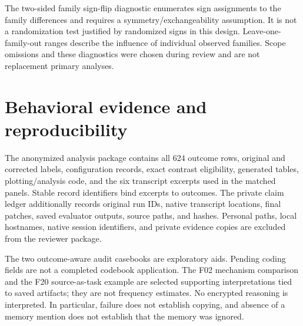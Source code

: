 The two-sided family sign-flip diagnostic enumerates sign assignments to the family differences and requires a symmetry/exchangeability assumption. It is not a randomization test justified by randomized signs in this design. Leave-one-family-out ranges describe the influence of individual observed families. Scope omissions and these diagnostics were chosen during review and are not replacement primary analyses.

\begin{table}[p]
\centering\small
\caption{Exact eligible family sets for the primary and secondary contrasts. Repetitions are averaged within these families.}
\end{table}
\begin{table}[p]
\centering\small
\caption{Uniform family-omission sensitivity analyses for $\Delta U$, in percentage points. The same family omission applies across configurations.}
\end{table}
\begin{table}[p]
\centering\small
\caption{Leave-one-family-out ranges and exact sign-flip diagnostics for corrected $\Delta U$. These are exploratory diagnostics with the assumptions described in the text.}
\end{table}
\begin{table}[p]
\centering\small
\caption{Exploratory C$-$I contrasts with the same complete-family rule and bootstrap procedure. Byte-matched memory envelopes do not ensure equal tokens or semantic content.}
\end{table}

\section{Behavioral evidence and reproducibility}
The anonymized analysis package contains all 624 outcome rows, original and corrected labels, configuration records, exact contrast eligibility, generated tables, plotting/analysis code, and the six transcript excerpts used in the matched panels. Stable record identifiers bind excerpts to outcomes. The private claim ledger additionally records original run IDs, native transcript locations, final patches, saved evaluator outputs, source paths, and hashes. Personal paths, local hostnames, native session identifiers, and private evidence copies are excluded from the reviewer package.

The two outcome-aware audit casebooks are exploratory aids. Pending coding fields are not a completed codebook application. The F02 mechanism comparison and the F20 source-as-task example are selected supporting interpretations tied to saved artifacts; they are not frequency estimates. No encrypted reasoning is interpreted. In particular, failure does not establish copying, and absence of a memory mention does not establish that the memory was ignored.

